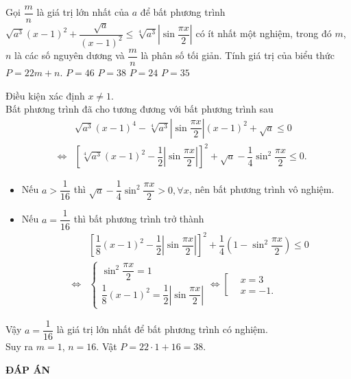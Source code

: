 \begin{ex}%
 Gọi $\dfrac{m}{n}$ là giá trị lớn nhất của $a$ để bất phương trình $\sqrt{a^3}(x-1)^2+\dfrac{\sqrt{a}}{(x-1)^2} \leq \sqrt[4]{a^3}\left|\sin\dfrac{\pi x}{2}\right|$ có ít nhất một nghiệm, trong đó $m$, $n$ là các số nguyên dương và $\dfrac{m}{n}$ là phân số tối giản. Tính giá trị của biểu thức $P=22m+n$.
 \choice
  {$P=46$}
  {\True $P=38$}
  {$P=24$}
  {$P=35$}
 \loigiai
  {
  Điều kiện xác định $x \neq 1$.\\
  Bất phương trình đã cho tương đương với bất phương trình sau
  \begin{eqnarray*}
   & & \sqrt{a^3}(x-1)^4 - \sqrt[4]{a^3}\left|\sin\dfrac{\pi x}{2}\right|(x-1)^2 + \sqrt{a} \leq 0\\
   &\Leftrightarrow & \left[ \sqrt[4]{a^3}(x-1)^2 - \dfrac{1}{2}\left|\sin\dfrac{\pi x}{2}\right| \right]^2 + \sqrt{a} - \dfrac{1}{4}\sin^2 \dfrac{\pi x}{2} \leq 0.
  \end{eqnarray*}
  \begin{itemize}
   \item Nếu $a > \dfrac{1}{16}$ thì $\sqrt{a} - \dfrac{1}{4}\sin^2 \dfrac{\pi x}{2} > 0, \forall x$, nên bất phương trình vô nghiệm.
   \item Nếu $a = \dfrac{1}{16}$ thì bất phương trình trở thành
   \begin{eqnarray*}
    & & \left[ \dfrac{1}{8}(x-1)^2 - \dfrac{1}{2}\left| \sin \dfrac{\pi x}{2} \right| \right]^2 + \dfrac{1}{4}\left( 1 - \sin^2 \dfrac{\pi x}{2} \right) \leq 0 \\
    &\Leftrightarrow & \begin{cases} \sin^2 \dfrac{\pi x}{2} = 1 \\ \dfrac{1}{8}(x-1)^2 = \dfrac{1}{2}\left| \sin \dfrac{\pi x}{2} \right| \end{cases} \Leftrightarrow \left[\begin{aligned} & x=3 \\& x=-1. \end{aligned}\right.
   \end{eqnarray*}
  \end{itemize}
  Vậy $a=\dfrac{1}{16}$ là giá trị lớn nhất để bất phương trình có nghiệm.\\
  Suy ra $m=1$, $n=16$. Vật $P = 22 \cdot 1 + 16 = 38$.
  }
\end{ex}



\newpage
\begin{center}
	\textbf{ĐÁP ÁN}
\end{center}
\begin{multicols}{10}
	 
\end{multicols}


